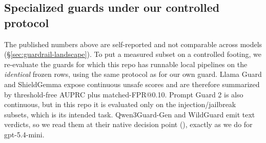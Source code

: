 
\subsection{Specialized guards under our controlled protocol}
\label{sec:guardrail-measured}

The published numbers above are self-reported and not comparable across models (\S\ref{sec:guardrail-landscape}). To put a measured subset on a controlled footing, we re-evaluate the guards for which this repo has runnable local pipelines on the \emph{identical} frozen rows, using the same protocol as for our own guard. Llama Guard and ShieldGemma expose continuous unsafe scores and are therefore summarized by threshold-free AUPRC plus matched-FPR@0.10. Prompt Guard 2 is also continuous, but in this repo it is evaluated only on the injection/jailbreak subsets, which is its intended task. Qwen3Guard-Gen and WildGuard emit text verdicts, so we read them at their native decision point (), exactly as we do for gpt-5.4-mini.

